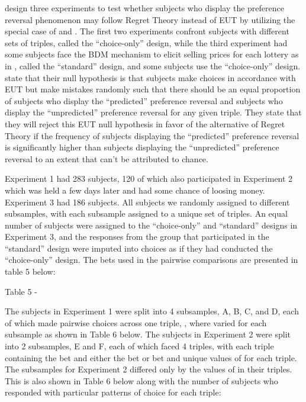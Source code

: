 \documentclass[../main.tex]{subfiles}
\begin{document}
\textcite{Loomes1989} design three experiments to test whether subjects who display the preference reversal phenomenon may follow Regret Theory instead of EUT by utilizing the special case of  and .
The first two experiments confront subjects with different sets of triples, called the \enquote{choice-only} design, while the third experiment had some subjects face the BDM mechanism to elicit selling prices for each lottery as in \textcite{Grether1979}, called the \enquote{standard} design, and some subjects use the \enquote{choice-only} design.
\textcite[142]{Loomes1989} state that their null hypothesis is that subjects make choices in accordance with EUT but make mistakes randomly such that there should be an equal proportion of subjects who display the \enquote{predicted} preference reversal and subjects who display the \enquote{unpredicted} preference reversal for any given triple.
They state that they will reject this EUT null hypothesis in favor of the alternative of Regret Theory if the frequency of subjects displaying the \enquote{predicted} preference reversal is significantly higher than subjects displaying the \enquote{unpredicted} preference reversal to an extent that can't be attributed to chance.

Experiment 1 had 283 subjects, 120 of which also participated in Experiment 2 which was held a few days later and had some chance of loosing money.
Experiment 3 had 186 subjects.
All subjects we randomly assigned to different subsamples, with each subsample assigned to a unique set of triples.
An equal number of subjects were assigned to the \enquote{choice-only} and \enquote{standard} designs in Experiment 3, and the responses from the group that participated in the \enquote{standard} design were imputed into choices as if they had conducted the \enquote{choice-only} design.
The bets used in the pairwise comparisons are presented in table 5 below:

Table 5 -  \textcite{Loomes1989}

The subjects in Experiment 1 were split into 4 subsamples, A, B, C, and D, each of which made pairwise choices across one triple, , where  varied for each subsample as shown in Table 6 below.
The subjects in Experiment 2 were split into 2 subsamples, E and F, each of which faced 4 triples, with each triple containing the  bet and either the  bet or  bet and unique values of  for each triple.
The subsamples for Experiment 2 differed only by the values of  in their triples.
This is also shown in Table 6 below along with the number of subjects who responded with particular patterns of choice for each triple:
\end{document}
